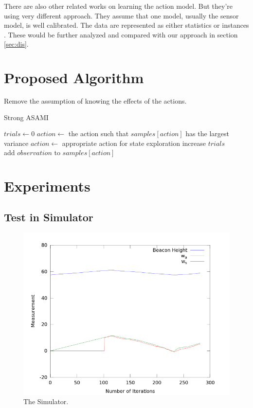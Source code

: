 \documentclass[10pt]{IEEEtran}
\begin{document}
There are also other related works on learning the action model. But
they're using very different approach. They assume that one model,
usually the sensor model, is well calibrated. The data are represented
as either statistics \cite{And_learningand} or instances
\cite{LNAI2007-ahmadi}. These would be further analyzed and compared
with our approach in section \ref{sec:dis}.

\section{Proposed Algorithm}

Remove the assumption of knowing the effects of the actions.

\begin{algorithm}
\caption{Strong ASAMI}\label{asami}
\begin{algorithmic}
\State $trials\gets 0$
            \State $action \gets$ the action such that $samples[action]$ has the largest variance
        \Else
            \State $action \gets$ appropriate action for state exploration
        \EndIf
        \State increase $trials$
    \EndWhile
\EndFunction
\\
    \State add $observation$ to $samples[action]$
\EndFunction
\end{algorithmic}
\end{algorithm}

\section{Experiments}

\subsection{Test in Simulator}

\begin{figure}
\centering
\includegraphics[width=\columnwidth]{simResult.png}
\caption{The Simulator.}
\label{fig:fuelworld}
\end{figure}
\end{document}
